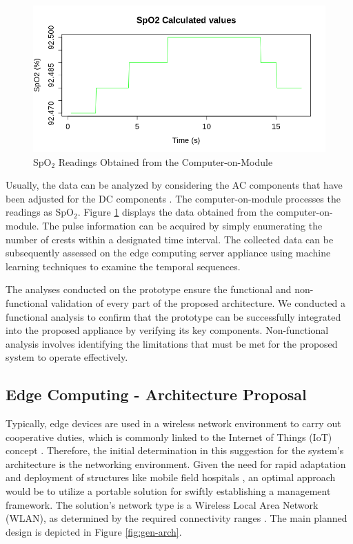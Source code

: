 \begin{figure}[h!]
    \centering
    \includegraphics[width = .6\linewidth]{Figures/SPO2.png}
    \caption{SpO$_2$ Readings Obtained from the Computer-on-Module}
    \label{fig:spo2}
\end{figure}

Usually, the data can be analyzed by considering the AC components that have been adjusted for the DC components \cite{tremper1989pulse}. The computer-on-module processes the readings as SpO$_2$. Figure \ref{fig:spo2} displays the data obtained from the computer-on-module. The pulse information can be acquired by simply enumerating the number of crests within a designated time interval. The collected data can be subsequently assessed on the edge computing server appliance using machine learning techniques to examine the temporal sequences.

The analyses conducted on the prototype ensure the functional and non-functional validation of every part of the proposed architecture. We conducted a functional analysis to confirm that the prototype can be successfully integrated into the proposed appliance by verifying its key components. Non-functional analysis involves identifying the limitations that must be met for the proposed system to operate effectively.

\subsection{Edge Computing - Architecture Proposal}

Typically, edge devices are used in a wireless network environment to carry out cooperative duties, which is commonly linked to the Internet of Things (IoT) concept \cite{long2017edge}. Therefore, the initial determination in this suggestion for the system's architecture is the networking environment. Given the need for rapid adaptation and deployment of structures like mobile field hospitals \cite{chen2020mobile}, an optimal approach would be to utilize a portable solution for swiftly establishing a management framework. The solution's network type is a Wireless Local Area Network (WLAN), as determined by the required connectivity ranges \cite{mahmoud2016study}. The main planned design is depicted in Figure \ref{fig:gen-arch}.

